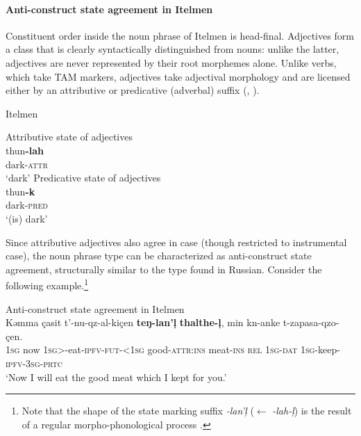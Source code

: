 \paragraph*{Anti\hyp{}construct state agreement in Itelmen}
\label{itelmen synchr}
Constituent order inside the noun phrase of Itelmen is head-final. Adjectives form a class that is clearly syntactically distinguished from nouns: unlike the latter, adjectives are never represented by their root morphemes alone. Unlike verbs, which take TAM markers, adjectives take adjectival morphology and are licensed either by an attributive or predicative (adverbal) suffix (\citealt{volodin1997}, \citealt[54]{georg-etal1999}).
\begin{exe}
\ex
\label{itelmen ex}
\rm{Itelmen \citep{volodin1997}} 
\begin{xlist}
\ex \rm{Attributive state of adjectives}\\
\gll	thun\textbf{-lah}\\
	dark-\textsc{attr}\\
\glt	‘dark’
\ex \rm{Predicative state of adjectives}\\
\gll	thun\textbf{-k}\\
	dark-\textsc{pred}\\
\glt	‘(is) dark’
\end{xlist}
\end{exe}
Since attributive adjectives also agree in case (though restricted to instrumental case), the noun phrase type can be characterized as anti\hyp{}construct state agreement, structurally similar to the type found in Russian. Consider the following example.\footnote{Note that the shape of the state marking suffix \textit{-lan'ļ} ($\leftarrow$ \textit{-lah-ļ}) is the result of a regular morpho-phonological process \citep{georg-etal1999}.}
\begin{exe}
\ex \rm{Anti\hyp{}construct state agreement in Itelmen \citep{georg-etal1999}}\\
\gll	Kəmma çasit t'-nu-qz-al-kiçen \textbf{teŋ-lan'ļ} \textbf{thalthe-ļ}, min kn-anke t-zapasa-qzo-çen.\\
	\textsc{1sg} now \textsc{1sg}>-eat-\textsc{ipfv-fut-<1sg} good-\textsc{attr:ins} meat-\textsc{ins} \textsc{rel} \textsc{1sg-dat} \textsc{1sg}-keep-\textsc{ipfv-3sg-prtc}\\
\glt	‘Now I will eat the good meat which I kept for you.’
\end{exe}

